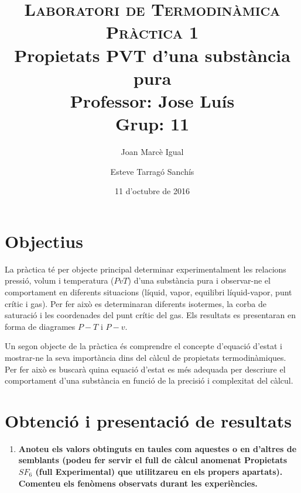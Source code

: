 \documentclass[a4paper]{article}
\title{
	\textsc{Laboratori de Termodinàmica} \\
	\textsc{Pràctica 1} \\
	Propietats PVT d'una substància pura \\
	\large
	Professor: Jose Luís \\ Grup: 11 }
\author{Joan Marcè Igual \and Esteve Tarragó Sanchís}
\date{11 d'octubre de 2016}
\begin{document}
\maketitle

\section*{Objectius}
La pràctica té per objecte principal determinar experimentalment les relacions pressió, volum i temperatura ($PvT$) d'una substància pura i observar-ne el comportament en diferents situacions (líquid, vapor, equilibri líquid-vapor, punt crític i gas). Per fer això es determinaran diferents isotermes, la corba de saturació i les coordenades del punt crític del gas. Els resultats es presentaran en forma de diagrames $P-T$ i $P-v$.

Un segon objecte de la pràctica és comprendre el concepte d’equació d’estat i mostrar-ne la seva importància dins del càlcul de propietats termodinàmiques. Per fer això es buscarà quina equació d’estat es més adequada per descriure el comportament d’una substància en funció de la precisió i complexitat del càlcul.


\section*{Obtenció i presentació de resultats}

\begin{enumerate}
	\item \textbf{Anoteu els valors obtinguts en taules com aquestes o en d’altres de semblants (podeu fer servir el full de càlcul anomenat \textbf{Propietats $SF_6$ (full Experimental)} que utilitzareu en els propers apartats). Comenteu els fenòmens observats durant les experiències.}
\end{enumerate}
\end{document}
